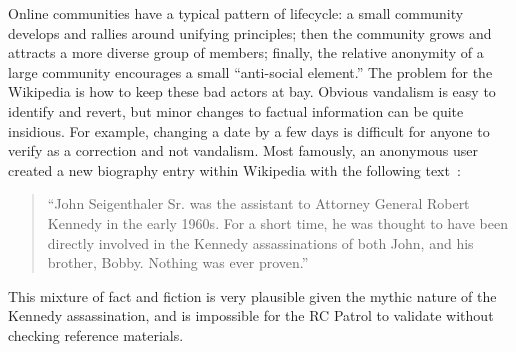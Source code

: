Online communities have a typical pattern of lifecycle:
a small community develops and rallies around unifying principles;
then the community grows and attracts a more diverse group of members;
finally, the relative anonymity of a large community encourages
a small ``anti-social element.''
The problem for the Wikipedia is how to keep these bad actors at bay.
Obvious vandalism is easy to identify and revert,
but minor changes to factual information can be quite insidious.
For example, changing a date by a few days is difficult for anyone
to verify as a correction and not vandalism.
Most famously, an anonymous user created a new biography entry
within Wikipedia with the following
text~\cite{Seigenthaler05,NewYorkTimes05a,NewYorkTimes05b}:
\begin{quote}
``John Seigenthaler Sr. was the assistant to
Attorney General Robert Kennedy in the early 1960s.
For a short time, he was thought to have been directly involved
in the Kennedy assassinations of both John, and his brother, Bobby.
Nothing was ever proven.''
\end{quote}
This mixture of fact and fiction is very plausible given the
mythic nature of the Kennedy assassination, and is impossible
for the RC Patrol to validate without checking reference materials.




